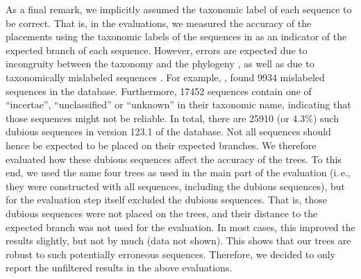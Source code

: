 As a final remark, we implicitly assumed the taxonomic label of each sequence to be correct.
That is, in the evaluations, we measured the accuracy of the placements
using the taxonomic labels of the sequences in  as an indicator of the expected branch of each sequence.
However, errors are expected due to incongruity between the taxonomy and the phylogeny \cite{Moreira2000},
as well as due to taxonomically mislabeled sequences \cite{Kozlov2016}.
For example,  \cite{Kozlov2016},
found \num{9 934} mislabeled sequences in the  database.
Furthermore, \num{17 452} sequences contain one of ``incertae'', ``unclassified'' or ``unknown'' in their taxonomic name,
indicating that those sequences might not be reliable.
In total, there are \num{25 910} (or \num{4.3}\%) such dubious sequences in version 123.1 of the  database.
Not all sequences should hence be expected to be placed on their expected branches.
We therefore evaluated how these dubious sequences affect the accuracy of the trees.
To this end, we used the same four trees as used in the main part of the evaluation
(i.\,e., they were constructed with all sequences, including the dubious sequences),
but for the evaluation step itself excluded the dubious sequences.
That is, those dubious sequences were not placed on the trees,
and their distance to the expected branch was not used for the evaluation.
In most cases, this improved the results slightly, but not by much (data not shown).
This shows that our trees are robust to such potentially erroneous sequences.
Therefore, we decided to only report the unfiltered results in the above evaluations.


